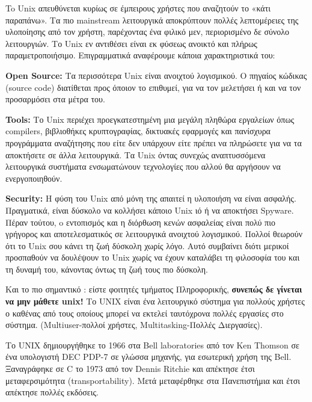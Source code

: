 To Unix απευθύνεται κυρίως σε έμπειρους χρήστες που αναζητούν το «κάτι παραπάνω». Τα πιο mainstream λειτουργικά αποκρύπτουν πολλές
λεπτομέρειες της υλοποίησης από τον χρήστη, παρέχοντας ένα φιλικό μεν, περιορισμένο δε σύνολο λειτουργιών. Το Unix εν αντιθέσει είναι εκ
φύσεως  ανοικτό και πλήρως παραμετροποιήσιμο. Επιγραμματικά αναφέρουμε κάποια χαρακτηριστικά του: 


\begin{packed_item}
  \item \textbf{Open Source:} Τα περισσότερα Unix είναι ανοιχτού λογισμικού. O πηγαίος κώδικας (source code) διατίθεται προς όποιον το επιθυμεί, για να τον μελετήσει ή και να τον προσαρμόσει στα μέτρα του. 
  \item \textbf{Tools:} Το Unix περιέχει προεγκατεστημένη μια μεγάλη πληθώρα εργαλείων όπως compilers, βιβλιοθήκες κρυπτογραφίας, δικτυακές εφαρμογές και πανίσχυρα προγράμματα αναζήτησης που είτε δεν υπάρχουν είτε πρέπει να πληρώσετε για να τα αποκτήσετε σε άλλα λειτουργικά. Τα Unix όντας συνεχώς αναπτυσσόμενα λειτουργικά συστήματα ενσωματώνουν  τεχνολογίες που αλλού θα αργήσουν να ενεργοποιηθούν. 
  \item \textbf{Security:} Η φύση του Unix από μόνη της απαιτεί η υλοποιήση να είναι ασφαλής. Πραγματικά, είναι δύσκολο να κολλήσει κάποιο 	Unix ιό ή να αποκτήσει Spyware. Πέραν τούτου, o εντοπισμός και η διόρθωση κενών ασφαλείας είναι πολύ πιο γρήγορος και αποτελεσματικός σε λειτουργικά ανοιχτού λογισμικού. Πολλοί θεωρούν ότι το Unix σου κάνει τη ζωή δύσκολη χωρίς λόγο. Αυτό συμβαίνει διότι μερικοί προσπαθούν να δουλέψουν το Unix χωρίς να έχουν καταλάβει τη φιλοσοφία του και τη δυναμή του, κάνοντας όντως τη ζωή τους πιο δύσκολη.
\end{packed_item}

Και το πιο σημαντικό : είστε φοιτητές τμήματος Πληροφορικής, \textbf{συνεπώς δε γίνεται να μην μάθετε unix!}
Το UNIX είναι ένα λειτουργικό σύστημα για πολλούς χρήστες ο καθένας από τους οποίους μπορεί να εκτελεί ταυτόχρονα πολλές εργασίες στο σύστημα. (Multiuser-πολλοί χρήστες, Multitasking-Πολλές Διεργασίες).

Το UNIX δημιουργήθηκε το 1966 στα Bell laboratories από τον Ken Thomson σε ένα υπολογιστή DEC PDP-7 σε γλώσσα μηχανής, για εσωτερική χρήση της Bell. Ξαναγράφηκε σε C το 1973 από τον Dennis Ritchie και απέκτησε έτσι μεταφερσιμότητα (transportability). Μετά μεταφέρθηκε στα Πανεπιστήμια και έτσι απέκτησε πολλές εκδόσεις.  

